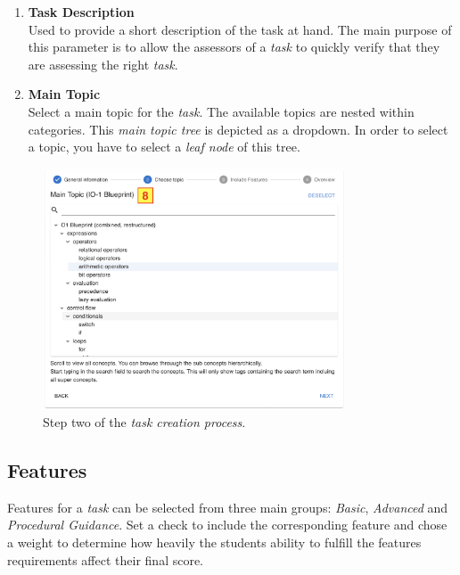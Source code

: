 \begin{enumerate}
  \item \textbf{Task Description} \\
    Used to provide a short description of the task at hand. The main purpose of this parameter is to allow the assessors of a \textit{task} to quickly verify that they are assessing the right \textit{task}.
  \item \textbf{Main Topic} \\
    Select a main topic for the \textit{task}. The available topics are nested within categories. This \textit{main topic tree} is depicted as a dropdown. In order to select a topic, you have to select a \textit{leaf node} of this tree.

\end{enumerate}

\begin{figure}[h]
  \begin{center}
    \includegraphics[width=0.8\textwidth]{figures/taskcreation2}
  \end{center}
  \caption{Step two of the \textit{task creation process}.}
  \label{fig:taskcreation2}
\end{figure}

\subsection{Features}
\label{sub:features}
Features for a \textit{task} can be selected from three main groups: \textit{Basic}, \textit{Advanced} and \textit{Procedural Guidance}.
Set a check to include the corresponding feature and chose a weight to determine how heavily the students ability to fulfill the features requirements affect their final score.

